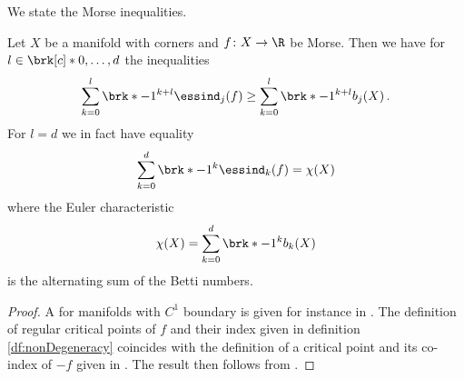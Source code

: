We state the Morse inequalities.
\begin{theorem}
Let $X$ be a manifold with corners and $f\colon X\to\R$ be Morse.
Then we have for $l\in\brk[c]*{0,\dots,d}$ the inequalities
\begin{align*}
  \sum_{k=0}^l \brk*{-1}^{k+l}\essind_j(f)\geq \sum_{k=0}^l\brk*{-1}^{k+l}b_j(X)\,.
\end{align*}
For $l=d$ we in fact have equality
\begin{align*}
  \sum_{k=0}^d \brk*{-1}^{k}\essind_k(f)= \chi(X)
\end{align*}
where the Euler characteristic
\begin{align*}
  \chi(X)=\sum_{k=0}^d\brk*{-1}^{k}b_k(X)
\end{align*}
is the alternating sum of the Betti numbers.
\end{theorem}
\begin{proof}
  A for manifolds with $C^1$ boundary is given for instance in \cite[Theorem 10.2']{Morse1969}.
  The definition of regular critical points of $f$ and their index given in definition \ref{df:nonDegeneracy} coincides with 
  the definition of a critical point and its co-index of $-f$ given in \cite{Agrach1991}.
  The result then follows from \cite[Theorem 2.4]{Agrach1991}.
\end{proof}

